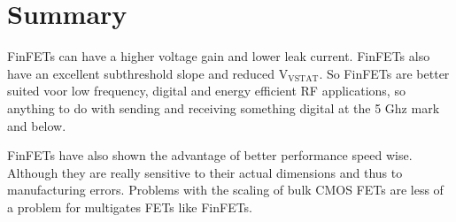 \documentclass{article}
\begin{document}
\section{Summary}
FinFETs can have a higher voltage gain and lower leak current. FinFETs also have an excellent subthreshold slope and reduced $\mathrm{V}_{\mathrm{VSTAT}}$. So FinFETs are better suited voor low frequency, digital and energy efficient RF applications, so anything to do with sending and receiving something digital at the 5 Ghz mark and below. \cite{1609503}

FinFETs have also shown the advantage of better performance speed wise. Although they are really sensitive to their actual dimensions and thus to manufacturing errors. \cite{Liao20139}
Problems with the scaling of bulk CMOS FETs are less of a problem for multigates FETs like FinFETs.\cite{5318794} \cite{6006523}


\printbibliography
\end{document}
